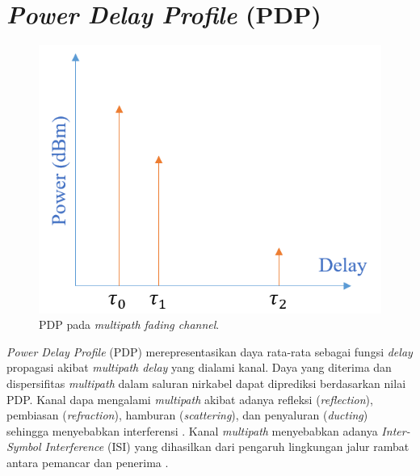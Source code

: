 
\section{\textit{Power Delay Profile} (PDP)}
\begin{figure}[b!]
	\centering
	\includegraphics[scale=0.85]
		{pics/PDP.png}
		\caption{PDP pada \textit{multipath fading channel}.}
	\label{fig:PDP}
\end{figure}
\textit{Power Delay Profile} (PDP) merepresentasikan daya rata-rata sebagai fungsi \textit{delay} propagasi akibat \textit{multipath delay} yang dialami kanal. Daya yang diterima dan dispersifitas \textit{multipath} dalam saluran nirkabel dapat diprediksi berdasarkan nilai PDP. Kanal dapa mengalami \textit{multipath} akibat adanya refleksi (\textit{reflection}), pembiasan (\textit{refraction}), hamburan (\textit{scattering}), dan penyaluran (\textit{ducting}) sehingga menyebabkan interferensi \cite{pdp2}. Kanal \textit{multipath} menyebabkan adanya \textit{Inter-Symbol Interference} (ISI) yang dihasilkan dari pengaruh lingkungan jalur rambat antara pemancar dan penerima \cite{pdp1}. 

